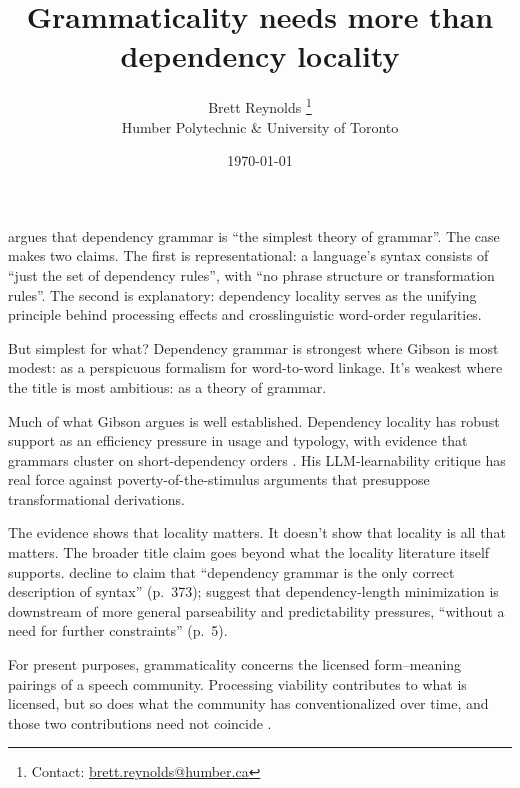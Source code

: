 \documentclass[12pt]{article}
\title{Grammaticality needs more than dependency locality}
\author{Brett Reynolds \orcidlink{0000-0003-0073-7195}%
\thanks{Contact: \href{mailto:brett.reynolds@humber.ca}{brett.reynolds@humber.ca}}\\
Humber Polytechnic \& University of Toronto}
\date{\today}
\begin{document}
\maketitle


\textcite{gibson2026} argues that dependency grammar is \enquote{the simplest theory of grammar}.
The case makes two claims.
The first is representational: a language's syntax consists of \enquote{just the set of dependency rules}, with \enquote{no phrase structure or transformation rules}.
The second is explanatory: dependency locality serves as the unifying principle behind processing effects and crosslinguistic word-order regularities.

But simplest for what?
Dependency grammar is strongest where Gibson is most modest: as a perspicuous formalism for word-to-word linkage.
It's weakest where the title is most ambitious: as a theory of grammar.

Much of what Gibson argues is well established.
Dependency locality has robust support as an efficiency pressure in usage and typology, with evidence that grammars cluster on short-dependency orders \citep{futrellMahowaldGibson2015}.
His LLM-learnability critique has real force against poverty-of-the-stimulus arguments that presuppose transformational derivations.

The evidence shows that locality matters.
It doesn't show that locality is all that matters.
The broader title claim goes beyond what the locality literature itself supports.
\textcite{futrell2020} decline to claim that \enquote{dependency grammar is the only correct description of syntax} (p.~373); \textcite{hahnJurafskyFutrell2020} suggest that dependency-length minimization is downstream of more general parseability and predictability pressures, \enquote{without a need for further constraints} (p.~5).

For present purposes, grammaticality concerns the licensed form--meaning pairings of a speech community.
Processing viability contributes to what is licensed, but so does what the community has conventionalized over time, and those two contributions need not coincide \citep{reynoldsmiller2026grammaticality}.
\end{document}
